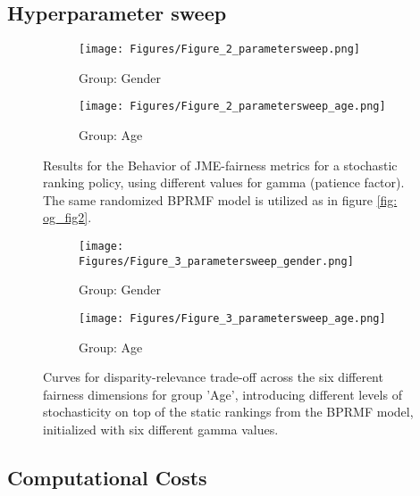 \renewcommand{\thesubsection}{\textbf{\textcolor{black}{F}}}
\subsection{Hyperparameter sweep} \label{paramter_sweep}
\begin{figure}[H]
    \centering
    \begin{subfigure}{\textwidth}
        \texttt{[image: Figures/Figure\_2\_parametersweep.png]}
        \caption{Group: Gender}
    \end{subfigure}
    \begin{subfigure}{\textwidth}
        \texttt{[image: Figures/Figure\_2\_parametersweep\_age.png]}
        \caption{Group: Age}
    \end{subfigure}
        \label{fig: param_fig2}
        \caption{Results for the Behavior of JME-fairness metrics for a stochastic ranking policy, using different values for gamma (patience factor). The same randomized BPRMF model is utilized as in figure \ref{fig: og_fig2}.}
\end{figure}

\begin{figure}[H]
    \centering
    \begin{subfigure}{\textwidth}
        \centering
        \texttt{[image: Figures/Figure\_3\_parametersweep\_gender.png]}
        \caption{Group: Gender}
    \end{subfigure}
    \begin{subfigure}{\textwidth}
        \centering
        \texttt{[image: Figures/Figure\_3\_parametersweep\_age.png]}
        \caption{Group: Age}
    \end{subfigure}
        \label{fig: param_fig3}
        \caption{Curves for disparity-relevance trade-off across the six different fairness dimensions for group 'Age', introducing different levels of stochasticity on top of the static rankings from the BPRMF model, initialized with six different gamma values.}
\end{figure}



\renewcommand{\thesubsection}{\textbf{\textcolor{black}{G}}}
\subsection{Computational Costs} \label{computation_costs}

